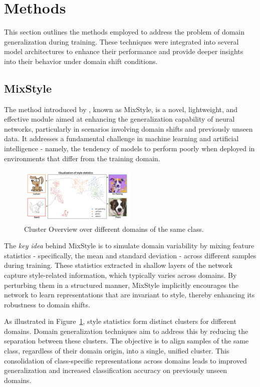 \section{Methods}
This section outlines the methods employed to address the problem of domain generalization during training. These techniques were integrated into several model architectures to enhance their performance and provide deeper insights into their behavior under domain shift conditions.
\subsection{MixStyle}
The method introduced by \cite{mixstyle_ref}, known as MixStyle, is a novel, lightweight, and effective module aimed at enhancing the generalization capability of neural networks, particularly in scenarios involving domain shifts and previously unseen data. It addresses a fundamental challenge in machine learning and artificial intelligence - namely, the tendency of models to perform poorly when deployed in environments that differ from the training domain.

\vspace{0.5cm}

\begin{figure}[h]
	\centering
	\includegraphics[width=0.5\textwidth]{images/mixstyle_domain.png}
	\caption{Cluster Overview over different domains of the same class.}
	\label{fig:mixstyle}
\end{figure}

\vspace{0.5cm}

The \textit{key idea} behind MixStyle is to simulate domain variability by mixing feature statistics - specifically, the mean and standard deviation - across different samples during training. These statistics extracted in shallow layers of the network capture style-related information, which typically varies across domains. By perturbing them in a structured manner, MixStyle implicitly encourages the network to learn representations that are invariant to style, thereby enhancing its robustness to domain shifts.

As illustrated in Figure~\ref{fig:mixstyle}, style statistics form distinct clusters for different domains. Domain generalization techniques aim to address this by reducing the separation between these clusters. The objective is to align samples of the same class, regardless of their domain origin, into a single, unified cluster. This consolidation of class-specific representations across domains leads to improved generalization and increased classification accuracy on previously unseen domains.

